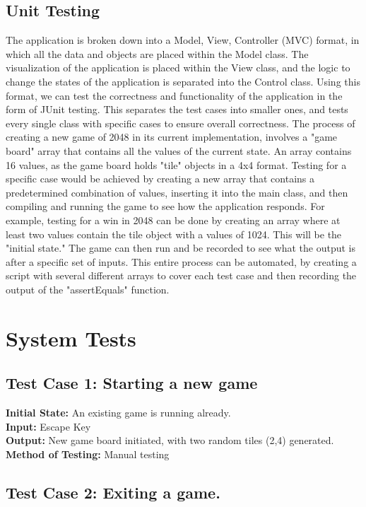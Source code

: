 \documentclass[12pt]{article}
\begin{document}
\subsection{Unit Testing}
The application is broken down into a Model, View, Controller (MVC) format, in which all the data and objects are placed within the Model class. The visualization of the application is placed within the View class, and the logic to change the states of the application is separated into the Control class. Using this format, we can test the correctness and functionality of the application in the form of JUnit testing. This separates the test cases into smaller ones, and tests every single class with specific cases to ensure overall correctness. The process of creating a new game of 2048 in its current implementation, involves a "game board" array that contains all the values of the current state. An array contains 16 values, as the game board holds "tile" objects in a 4x4 format. Testing for a specific case would be achieved by creating a new array that contains a predetermined combination of values, inserting it into the main class, and then compiling and running the game to see how the application responds. For example, testing for a win in 2048 can be done by creating an array where at least two values contain the tile object with a values of 1024. This will be the "initial state." The game can then run and be recorded to see what the output is after a specific set of inputs. This entire process can be automated, by creating a script with several different arrays to cover each test case and then recording the output of the "assertEquals" function. \\

\section{System Tests}
\subsection{Test Case 1: Starting a new game}

\textbf{Initial State:} An existing game is running already. \\
\textbf{Input:} Escape Key\\
\textbf{Output:} New game board initiated, with two random tiles (2,4) generated.
\textbf{Method of Testing:} Manual testing

\subsection{Test Case 2: Exiting a game.}
\end{document}
